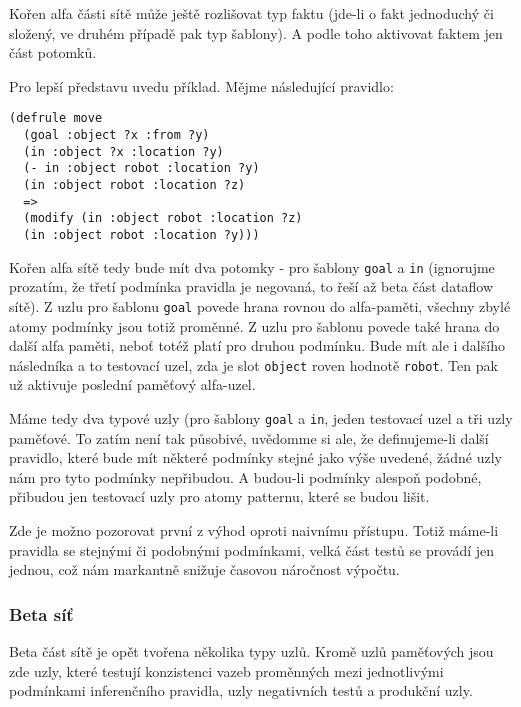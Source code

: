 Kořen alfa části sítě může ještě rozlišovat typ faktu (jde-li o fakt
jednoduchý či složený, ve druhém případě pak typ šablony). A podle toho
aktivovat faktem jen část potomků.

Pro lepší představu uvedu příklad. Mějme následující pravidlo:
\begin{verbatim}
(defrule move
  (goal :object ?x :from ?y)
  (in :object ?x :location ?y)
  (- in :object robot :location ?y)
  (in :object robot :location ?z)
  =>
  (modify (in :object robot :location ?z)
  (in :object robot :location ?y)))
\end{verbatim}
Kořen alfa sítě tedy bude mít dva potomky - pro šablony \verb|goal|
a \verb|in| (ignorujme prozatím, že třetí podmínka pravidla je negovaná,
to řeší až beta část dataflow sítě). Z uzlu pro šablonu \verb|goal|
povede hrana rovnou do alfa-paměti, všechny zbylé atomy podmínky jsou
totiž proměnné. Z uzlu pro šablonu povede také hrana do další alfa
paměti, neboť totéž platí pro druhou podmínku. Bude mít ale i dalšího
následníka a to testovací uzel, zda je slot \verb|object| roven hodnotě
\verb|robot|. Ten pak už aktivuje poslední paměťový alfa-uzel.

Máme tedy dva typové uzly (pro šablony \verb|goal| a \verb|in|, jeden
testovací uzel a tři uzly paměťové. To zatím není tak působivé,
uvědomme si ale, že definujeme-li další pravidlo, které bude mít
některé podmínky stejné jako výše uvedené, žádné uzly nám pro tyto
podmínky nepřibudou. A budou-li podmínky alespoň podobné, přibudou
jen testovací uzly pro atomy patternu, které se budou lišit.

Zde je možno pozorovat první z výhod oproti naivnímu přístupu. Totiž
máme-li pravidla se stejnými či podobnými podmínkami, velká část testů
se provádí jen jednou, což nám markantně snižuje časovou náročnost výpočtu.

\subsubsection{Beta síť}
Beta část sítě je opět tvořena několika typy uzlů. Kromě uzlů paměťových
jsou zde uzly, které testují konzistenci vazeb proměnných mezi jednotlivými
podmínkami inferenčního pravidla, uzly negativních testů a produkční uzly.

